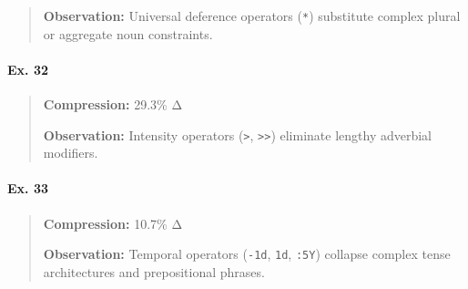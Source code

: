 \begin{Shaded}
\begin{Shaded}
\begin{Shaded}
\begin{Shaded}
\begin{Shaded}
\begin{Shaded}
\begin{Shaded}
\begin{Shaded}
\begin{Shaded}
\begin{quote}
\textbf{Observation:} Universal deference operators (\texttt{*})
substitute complex plural or aggregate noun constraints.
\end{quote}

\paragraph{Ex. 32}\label{ex.-32}

\begin{Shaded}
\begin{Highlighting}[]
\end{Highlighting}
\end{Shaded}

\begin{quote}
\textbf{Compression:} 29.3\% Δ

\textbf{Observation:} Intensity operators (\texttt{\textgreater{}},
\texttt{\textgreater{}\textgreater{}}) eliminate lengthy adverbial
modifiers.
\end{quote}

\paragraph{Ex. 33}\label{ex.-33}

\begin{Shaded}
\begin{Highlighting}[]
\end{Highlighting}
\end{Shaded}

\begin{quote}
\textbf{Compression:} 10.7\% Δ

\textbf{Observation:} Temporal operators (\texttt{-1d}, \texttt{1d},
\texttt{:5Y}) collapse complex tense architectures and prepositional
phrases.
\end{quote}


\end{Shaded}
\end{Shaded}
\end{Shaded}
\end{Shaded}
\end{Shaded}
\end{Shaded}
\end{Shaded}
\end{Shaded}
\end{Shaded}
